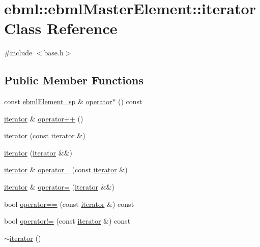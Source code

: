 \hypertarget{classebml_1_1ebmlMasterElement_1_1iterator}{}\section{ebml\+:\+:ebml\+Master\+Element\+:\+:iterator Class Reference}
\label{classebml_1_1ebmlMasterElement_1_1iterator}


{\ttfamily \#include $<$base.\+h$>$}

\subsection*{Public Member Functions}
\begin{DoxyCompactItemize}
\item 
const \mbox{\hyperlink{namespaceebml_adad533b7705a16bb360fe56380c5e7be}{ebml\+Element\+\_\+sp}} \& \mbox{\hyperlink{classebml_1_1ebmlMasterElement_1_1iterator_ad6c25c2646a81bd03948ca61f768af68}{operator$\ast$}} () const
\item 
\mbox{\hyperlink{classebml_1_1ebmlMasterElement_1_1iterator}{iterator}} \& \mbox{\hyperlink{classebml_1_1ebmlMasterElement_1_1iterator_a92ad796c55701c667c114ac54dc5004f}{operator++}} ()
\item 
\mbox{\hyperlink{classebml_1_1ebmlMasterElement_1_1iterator_aff65b96ef2b667cd5044d594da574d79}{iterator}} (const \mbox{\hyperlink{classebml_1_1ebmlMasterElement_1_1iterator}{iterator}} \&)
\item 
\mbox{\hyperlink{classebml_1_1ebmlMasterElement_1_1iterator_a36ed970a665ddd45cadee9dee281d334}{iterator}} (\mbox{\hyperlink{classebml_1_1ebmlMasterElement_1_1iterator}{iterator}} \&\&)
\item 
\mbox{\hyperlink{classebml_1_1ebmlMasterElement_1_1iterator}{iterator}} \& \mbox{\hyperlink{classebml_1_1ebmlMasterElement_1_1iterator_a162e7b8f1e830065d05b632314afb28a}{operator=}} (const \mbox{\hyperlink{classebml_1_1ebmlMasterElement_1_1iterator}{iterator}} \&)
\item 
\mbox{\hyperlink{classebml_1_1ebmlMasterElement_1_1iterator}{iterator}} \& \mbox{\hyperlink{classebml_1_1ebmlMasterElement_1_1iterator_a91f28b49e638ea9fa9c5ea5a6807e567}{operator=}} (\mbox{\hyperlink{classebml_1_1ebmlMasterElement_1_1iterator}{iterator}} \&\&)
\item 
bool \mbox{\hyperlink{classebml_1_1ebmlMasterElement_1_1iterator_afb3fe9d5db619b912eec528d2b2d71c5}{operator==}} (const \mbox{\hyperlink{classebml_1_1ebmlMasterElement_1_1iterator}{iterator}} \&) const
\item 
bool \mbox{\hyperlink{classebml_1_1ebmlMasterElement_1_1iterator_a61dc214c93030ee9749e760aa1b4b112}{operator!=}} (const \mbox{\hyperlink{classebml_1_1ebmlMasterElement_1_1iterator}{iterator}} \&) const
\item 
\mbox{\hyperlink{classebml_1_1ebmlMasterElement_1_1iterator_a0f90808779c8545321c75488c8027e20}{$\sim$iterator}} ()
\end{DoxyCompactItemize}
